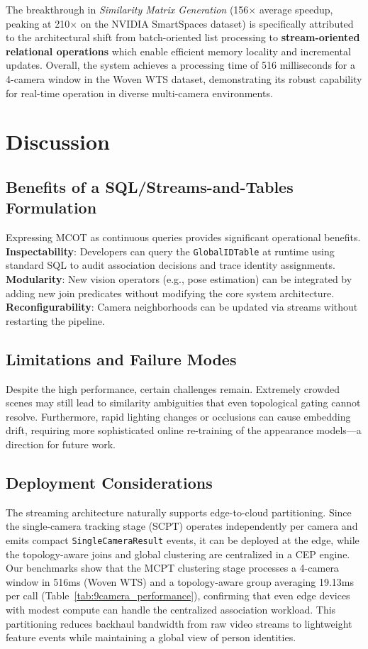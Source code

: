 \documentclass[11pt]{article}
\begin{document}
The breakthrough in \emph{Similarity Matrix Generation} (156$\times$ average speedup, peaking at 210$\times$ on the NVIDIA SmartSpaces dataset) is specifically attributed to the architectural shift from batch-oriented list processing to \textbf{stream-oriented relational operations} which enable efficient memory locality and incremental updates. Overall, the system achieves a processing time of 516 milliseconds for a 4-camera window in the Woven WTS dataset, demonstrating its robust capability for real-time operation in diverse multi-camera environments.





\section{Discussion}\label{sec:discussion}
\subsection{Benefits of a SQL/Streams-and-Tables Formulation}
Expressing MCOT as continuous queries provides significant operational benefits. \textbf{Inspectability}: Developers can query the \texttt{GlobalIDTable} at runtime using standard SQL to audit association decisions and trace identity assignments. \textbf{Modularity}: New vision operators (e.g., pose estimation) can be integrated by adding new join predicates without modifying the core system architecture. \textbf{Reconfigurability}: Camera neighborhoods can be updated via streams without restarting the pipeline.

\subsection{Limitations and Failure Modes}
Despite the high performance, certain challenges remain. Extremely crowded scenes may still lead to similarity ambiguities that even topological gating cannot resolve. Furthermore, rapid lighting changes or occlusions can cause embedding drift, requiring more sophisticated online re-training of the appearance models—a direction for future work.

\subsection{Deployment Considerations}
The streaming architecture naturally supports edge-to-cloud partitioning. Since the single-camera tracking stage (SCPT) operates independently per camera and emits compact \texttt{SingleCameraResult} events, it can be deployed at the edge, while the topology-aware joins and global clustering are centralized in a CEP engine. Our benchmarks show that the MCPT clustering stage processes a 4-camera window in 516ms (Woven WTS) and a topology-aware group averaging 19.13ms per call (Table~\ref{tab:9camera_performance}), confirming that even edge devices with modest compute can handle the centralized association workload. This partitioning reduces backhaul bandwidth from raw video streams to lightweight feature events while maintaining a global view of person identities.
\end{document}
